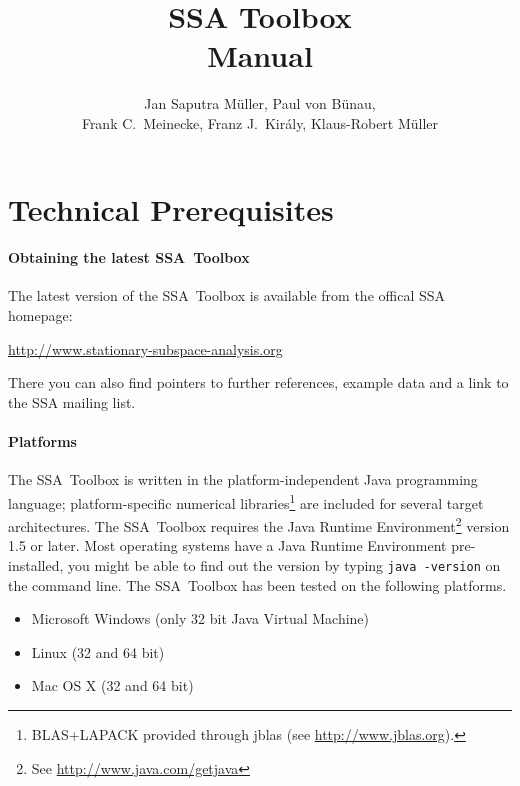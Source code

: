 \documentclass{article}
\newcommand{\1}{\ensuremath{\mathds{1}}}
\newcommand{\0}{\ensuremath{0}}
\begin{document}
\title{SSA Toolbox  \\ Manual}
\author{Jan Saputra M\"uller, Paul von B\"unau, \\ Frank C.~Meinecke, Franz J.~Kir\'{a}ly, Klaus-Robert M\"uller}

\maketitle

\tableofcontents

\newpage

\section{Technical Prerequisites}

\paragraph{Obtaining the latest SSA~Toolbox}

The latest version of the SSA~Toolbox is available from the offical SSA homepage: 
\begin{center}
	\url{http://www.stationary-subspace-analysis.org}
\end{center}
There you can also find pointers to further references, example data and a link 
to the SSA mailing list. 

\paragraph{Platforms}

The SSA~Toolbox is written in the platform-independent Java programming language; 
platform-specific numerical libraries\footnote{BLAS+LAPACK provided through
jblas (see \url{http://www.jblas.org}).} are included for several target architectures. 
The SSA~Toolbox requires the Java Runtime Environment\footnote{See 
\url{http://www.java.com/getjava}} version 1.5 or later. Most operating systems
have a Java Runtime Environment pre-installed, you might be able to find out 
the version by typing \texttt{java -version} on the command line. The SSA~Toolbox has 
been tested on the following platforms.
\begin{itemize}
	\item Microsoft Windows (only 32 bit Java Virtual Machine)
	\item Linux (32 and 64 bit)
	\item Mac OS X (32 and 64 bit)
\end{itemize}
\end{document}
